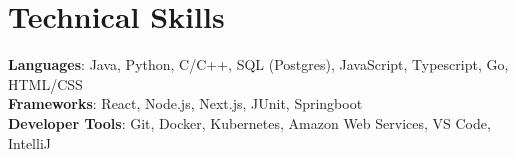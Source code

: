 \documentclass[letterpaper,11pt]{article}
\begin{document}
%
\section{Technical Skills}
 \begin{itemize}[leftmargin=0.15in, label={}]
    \small{\item{
     \textbf{Languages}{: Java, Python, C/C++, SQL (Postgres), JavaScript, Typescript, Go, HTML/CSS} \\
     \textbf{Frameworks}{: React, Node.js, Next.js, JUnit,  Springboot} \\
     \textbf{Developer Tools}{: Git, Docker, Kubernetes, Amazon Web Services, VS Code, IntelliJ} \\
    }}
 \end{itemize}


\end{document}
